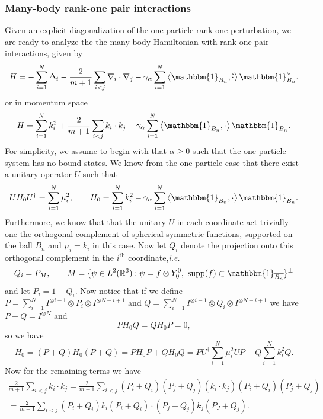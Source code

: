 \documentclass[a4paper,11pt]{article}
\newcommand{\supp}{\text{supp}}
\renewcommand{\braket}[1]{\left\langle#1\right\rangle}
\newcommand{\ie}{\emph{i.e.} }
\newcommand{\R}{\mathbb{R}}
\numberwithin{equation}{section}
\begin{document}
	\subsubsection{Many-body rank-one pair interactions}
	Given an explicit diagonalization of the one particle rank-one perturbation, we are ready to analyze the the many-body Hamiltonian with rank-one pair interactions, given by \begin{equation}
	H=-\sum_{i=1}^{N}\Delta_i-\frac{2}{m+1}\sum_{i<j}\nabla_i\cdot\nabla_j-\gamma_\alpha\sum_{i=1}^{N}\braket{\mathbbm{1}_{B_n},\hat{\cdot}}\mathbbm{1}_{B_n}^\vee.
	\end{equation}
	or in momentum space \begin{equation}
	H=\sum_{i=1}^{N}k_i^2+\frac{2}{m+1}\sum_{i<j}k_i\cdot k_j-\gamma_\alpha\sum_{i=1}^{N}\braket{\mathbbm{1}_{B_n},\cdot}\mathbbm{1}_{B_n}.
	\end{equation}
	For simplicity, we assume to begin with that $ \alpha\geq0 $ such that the one-particle system has no bound states. We know from the one-particle case that there exist a unitary operator $ U $ such that \begin{equation}
	UH_0U^\dagger=\sum_{i=1}^{N}\mu_i^2, \qquad H_0=\sum_{i=1}^{N}k_i^2-\gamma_\alpha\sum_{i=1}^{N}\braket{\mathbbm{1}_{B_n},\cdot}\mathbbm{1}_{B_n}.
	\end{equation}
	Furthermore, we know that that the unitary $ U $ in each coordinate act trivially one the orthogonal complement of spherical symmetric functions, supported on the ball $ B_n $ and $ \mu_i=k_i $ in this case. Now let $ Q_i$ denote the projection onto this orthogonal complement in the $ i^\text{th} $ coordinate,\ie \begin{equation}
	Q_i=P_M,\qquad M=\{\psi\in L^2(\R^3):\psi=f\otimes Y_0^0,\ \supp(f)\subset\mathbbm{1}_{\overline{B_n}} \}^\perp
	\end{equation}
	and let $ P_i=1-Q_i $. Now notice that if we define $ P=\sum_{i=1}^{N}I^{\otimes i-1}\otimes P_i \otimes I^{\otimes N-i+1} $ and $ Q=\sum_{i=1}^{N}I^{\otimes i-1}\otimes Q_i \otimes I^{\otimes N-i+1} $ we have $ P+Q=I^{\otimes N} $ and  \begin{equation}
	PH_0Q=QH_0P=0, 
	\end{equation}
	so we have  \begin{equation}
	H_0=(P+Q)H_0(P+Q)=PH_0P+QH_0Q=PU^\dagger\sum_{i=1}^{N}\mu_i^2UP+Q\sum_{i=1}^{N}k_i^2Q.
	\end{equation}
	Now for the remaining terms we have \begin{equation}
	\begin{aligned}
	\frac{2}{m+1}\sum_{i<j} k_i\cdot k_j=\frac{2}{m+1}\sum_{i<j}(P_i+Q_i)(P_j+Q_j)(k_i\cdot k_j)(P_i+Q_i)(P_j+Q_j)\\
	=\frac{2}{m+1}\sum_{i<j}(P_i+Q_i)k_i(P_i+Q_i)\cdot (P_j+Q_j)k_j(P_J+Q_j).
	\end{aligned}
	\end{equation} 
\end{document}
